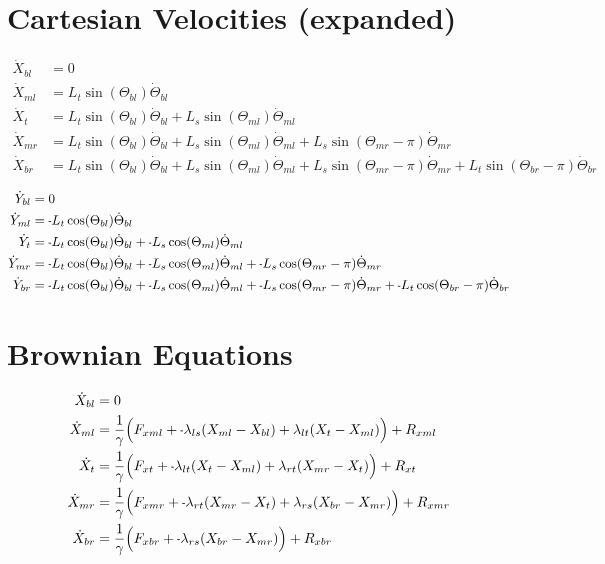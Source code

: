 \documentclass[11pt, landscape]{article}
\newcommand{\mn}{\scalebox{0.7}[1.0]{-}}
\begin{document}
\section{Cartesian Velocities (expanded)}
\begin{align}
  \dot{X}_{bl} &= 0 \\
  \dot{X}_{ml} &= L_{t}\sin(\Theta_{bl})  \dot{\Theta}_{bl} \\
  \dot{X}_{t } &= L_{t}\sin(\Theta_{bl})  \dot{\Theta}_{bl} + L_{s}\sin(\Theta_{ml})      \dot{\Theta}_{ml} \\
  \dot{X}_{mr} &= L_{t}\sin(\Theta_{bl})  \dot{\Theta}_{bl} + L_{s}\sin(\Theta_{ml})      \dot{\Theta}_{ml} + L_{s}\sin(\Theta_{mr}-\pi)  \dot{\Theta}_{mr} \\
  \dot{X}_{br} &= L_{t}\sin(\Theta_{bl})  \dot{\Theta}_{bl} + L_{s}\sin(\Theta_{ml})      \dot{\Theta}_{ml} + L_{s}\sin(\Theta_{mr}-\pi)  \dot{\Theta}_{mr} + L_{t}\sin(\Theta_{br}-\pi)  \dot{\Theta}_{br}
\end{align}             
             
\begin{align}                                                                               
  \dot{Y}_{bl} &= 0 \\                                                               
  \dot{Y}_{ml} &= \mn L_{t}\cos(\Theta_{bl})  \dot{\Theta}_{bl} \\
  \dot{Y}_{t}  &= \mn L_{t}\cos(\Theta_{bl})  \dot{\Theta}_{bl} + \mn L_{s}\cos(\Theta_{ml})  \dot{\Theta}_{ml} \\
  \dot{Y}_{mr} &= \mn L_{t}\cos(\Theta_{bl})  \dot{\Theta}_{bl} + \mn L_{s}\cos(\Theta_{ml})  \dot{\Theta}_{ml} + \mn L_{s}\cos(\Theta_{mr}-\pi)  \dot{\Theta}_{mr} \\
  \dot{Y}_{br} &= \mn L_{t}\cos(\Theta_{bl})  \dot{\Theta}_{bl} + \mn L_{s}\cos(\Theta_{ml})  \dot{\Theta}_{ml} + \mn L_{s}\cos(\Theta_{mr}-\pi)  \dot{\Theta}_{mr} + \mn L_{t}\cos(\Theta_{br}-\pi)  \dot{\Theta}_{br}
\end{align}


  \section{Brownian Equations}
\begin{align}  
  \dot{X}_{bl} &= 0 \\
  \dot{X}_{ml} &= \frac{1}{\gamma} \Big(F_{xml} + \mn \lambda_{ls}(X_{ml} - X_{bl}) + \lambda_{lt}(X_{t } - X_{ml}) \Big) + R_{xml} \\
  \dot{X}_{t } &= \frac{1}{\gamma} \Big(F_{xt } + \mn \lambda_{lt}(X_{t } - X_{ml}) + \lambda_{rt}(X_{mr} - X_{t }) \Big) + R_{xt } \\
  \dot{X}_{mr} &= \frac{1}{\gamma} \Big(F_{xmr} + \mn \lambda_{rt}(X_{mr} - X_{t }) + \lambda_{rs}(X_{br} - X_{mr}) \Big) + R_{xmr} \\
  \dot{X}_{br} &= \frac{1}{\gamma} \Big(F_{xbr} + \mn \lambda_{rs}(X_{br} - X_{mr})                                 \Big) + R_{xbr}
\end{align}
\end{document}
